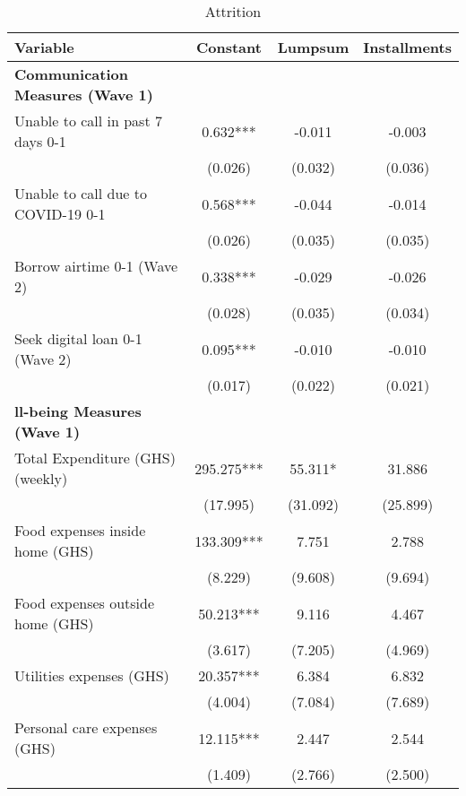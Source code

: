 \begin{ThreePartTable}
\begin{table}[tbp]\centering
\def\sym#1{\ifmmode^{#1}\else\(^{#1}\)\fi}
\caption{Attrition}
\begin{tabular}{lccc}
\hline
 Variable & Constant & Lumpsum & Installments \\ [0.1em] 
\hline\hline
\textbf{Communication Measures (Wave 1)} & & & \\ 
 Unable to call in past 7 days 0-1 & 0.632*** & -0.011 & -0.003 \\ [0.1em] 
                   &      (0.026)     &      (0.032)     &      (0.036)     \\ [0.1em] 
 Unable to call due to COVID-19 0-1 & 0.568*** & -0.044 & -0.014 \\ [0.1em] 
                   &      (0.026)     &      (0.035)     &      (0.035)     \\ [0.1em] 
 Borrow airtime 0-1 (Wave 2) & 0.338*** & -0.029 & -0.026 \\ [0.1em] 
                   &      (0.028)     &      (0.035)     &      (0.034)     \\ [0.1em] 
 Seek digital loan 0-1 (Wave 2) & 0.095*** & -0.010 & -0.010 \\ [0.1em] 
                   &      (0.017)     &      (0.022)     &      (0.021)     \\ [0.1em] 
\textbf{ll-being Measures (Wave 1)} & & & \\ 
 Total Expenditure (GHS) (weekly) & 295.275*** & 55.311* & 31.886 \\ [0.1em] 
                   &      (17.995)     &      (31.092)     &      (25.899)     \\ [0.1em] 
 Food expenses inside home (GHS) & 133.309*** & 7.751 & 2.788 \\ [0.1em] 
                   &      (8.229)     &      (9.608)     &      (9.694)     \\ [0.1em] 
 Food expenses outside home (GHS) & 50.213*** & 9.116 & 4.467 \\ [0.1em] 
                   &      (3.617)     &      (7.205)     &      (4.969)     \\ [0.1em] 
 Utilities expenses (GHS) & 20.357*** & 6.384 & 6.832 \\ [0.1em] 
                   &      (4.004)     &      (7.084)     &      (7.689)     \\ [0.1em] 
 Personal care expenses (GHS) & 12.115*** & 2.447 & 2.544 \\ [0.1em] 
                   &      (1.409)     &      (2.766)     &      (2.500)     \\ [0.1em] 

\end{tabular}
\end{table}
\end{ThreePartTable}
